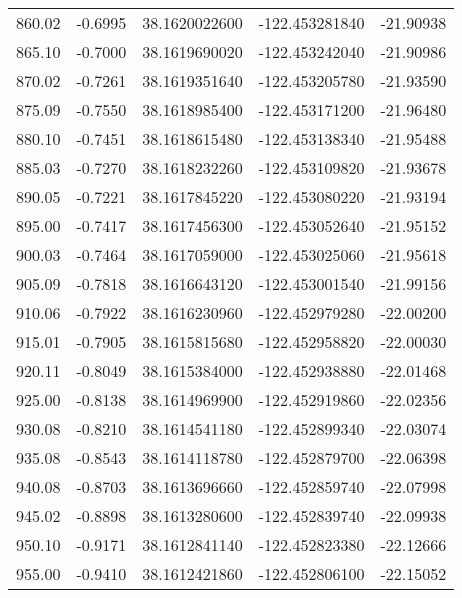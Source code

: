 \begin{longtable}{p{2.5cm}p{2.5cm}p{3cm}p{3cm}p{2.5cm}}
       860.02  & 	-0.6995 &               38.1620022600  &   -122.453281840   &	-21.90938 \\
       865.10  & 	-0.7000 &               38.1619690020  &   -122.453242040   &	-21.90986 \\
       870.02  & 	-0.7261 &               38.1619351640  &   -122.453205780   &	-21.93590 \\
       875.09  & 	-0.7550 &               38.1618985400  &   -122.453171200   &	-21.96480 \\
       880.10  & 	-0.7451 &               38.1618615480  &   -122.453138340   &	-21.95488 \\
       885.03  & 	-0.7270 &               38.1618232260  &   -122.453109820   &	-21.93678 \\
       890.05  & 	-0.7221 &               38.1617845220  &   -122.453080220   &	-21.93194 \\
       895.00  & 	-0.7417 &               38.1617456300  &   -122.453052640   &	-21.95152 \\
       900.03  & 	-0.7464 &               38.1617059000  &   -122.453025060   &	-21.95618 \\
       905.09  & 	-0.7818 &               38.1616643120  &   -122.453001540   &	-21.99156 \\
       910.06  & 	-0.7922 &               38.1616230960  &   -122.452979280   &	-22.00200 \\
       915.01  & 	-0.7905 &               38.1615815680  &   -122.452958820   &	-22.00030 \\
       920.11  & 	-0.8049 &               38.1615384000  &   -122.452938880   &	-22.01468 \\
       925.00  & 	-0.8138 &               38.1614969900  &   -122.452919860   &	-22.02356 \\
       930.08  & 	-0.8210 &               38.1614541180  &   -122.452899340   &	-22.03074 \\
       935.08  & 	-0.8543 &               38.1614118780  &   -122.452879700   &	-22.06398 \\
       940.08  & 	-0.8703 &               38.1613696660  &   -122.452859740   &	-22.07998 \\
       945.02  & 	-0.8898 &               38.1613280600  &   -122.452839740   &	-22.09938 \\
       950.10  & 	-0.9171 &               38.1612841140  &   -122.452823380   &	-22.12666 \\
       955.00  & 	-0.9410 &               38.1612421860  &   -122.452806100	&   -22.15052 \\

\end{longtable}

